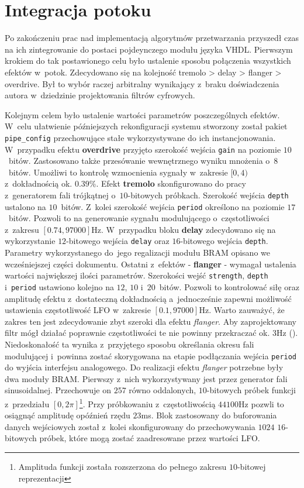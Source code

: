 \section{Integracja potoku}

Po zakończeniu prac nad implementacją algorytmów przetwarzania przyszedł czas na ich zintegrowanie do postaci pojdeynczego modułu języka VHDL. Pierwszym krokiem do tak postawionego celu było ustalenie sposobu połączenia wszystkich efektów w~potok. Zdecydowano się na kolejność tremolo > delay > flanger > overdrive. Był to wybór raczej arbitralny wynikający z~braku doświadczenia autora w~dziedzinie projektowania filtrów cyfrowych. 

Kolejnym celem było ustalenie wartości parametrów poszczególnych efektów. W~celu ułatwienie późniejszych rekonfiguracji systemu stworzony został pakiet \verb|pipe_config| przechowujące stałe wykorzystywane do ich instancjonowania. W~przypadku efektu \textbf{overdrive} przyjęto szerokość wejścia \verb|gain| na poziomie $10$~bitów. Zastosowano także przesówanie wewnętrznego wyniku mnożenia o~$8$~bitów. Umożliwi to kontrolę wzmocnienia sygnały w~zakresie $[0,4)$ z~dokładnością ok. $0.39$\%. Efekt \textbf{tremolo} skonfigurowano do pracy z~generatorem fali trójkątnej o~$10$-bitowych próbkach. Szerokość wejścia \verb|depth| ustalono na $10$~bitów. Z~kolei szerokość wejścia \verb|period| określono na poziomie $17$~bitów. Pozwoli to na generowanie sygnału modulującego o~częstotliwości z~zakresu $[0.74,97000]$Hz. W~przypadku bloku \textbf{delay} zdecydowano się na wykorzystanie $12$-bitowego wejścia \verb|delay| oraz $16$-bitowego wejścia \verb|depth|. Parametry wykorzystanego do~jego regalizacji modułu BRAM opisano we wcześniejszej części dokumentu. Ostatni z~efektów - \textbf{flanger} - wymagał ustalenia wartości największej ilości parametrów. Szerokości wejść \verb|strength|, \verb|depth| i~\verb|period| ustawiono kolejno na $12$, $10$ i~$20$~bitów. Pozwoli to kontrolować siłę oraz amplitudę efektu z~dostateczną dokładnością a~jednocześnie zapewni możliwość ustawienia częstotliwość LFO w~zakresie $[0.1,97000]$Hz. Warto zauważyć, że zakres ten jest zdecydowanie zbyt szeroki dla efektu \textit{flanger}. Aby zaprojektowany filtr mógł działać poprawnie częstotliwości te nie powinny przekraczać ok. $3$Hz (\cite{flanging_analysis}). Niedoskonałość ta wynika z~przyjętego sposobu określania okresu fali modulującej i~powinna zostać skorygowana na etapie podłączania wejścia \verb|period| do wyjścia interfejsu analogowego. Do realizacji efektu \textit{flanger} potrzebne były dwa moduły BRAM. Pierwszy z~nich wykorzystywany jest przez generator fali sinusoidalnej. Przechowuje on $257$ równo oddalonych, $10$-bitowych próbek funkcji z~przedziału $[0,2\pi]$\footnote{Amplituda funkcji została rozszerzona do pełnego zakresu $10$-bitowej reprezentacji}. Przy próbkowaniu z~częstotliwością $44100$Hz pozwli to osiągnąć amplitudę opóźnień rzędu $23$ms. Blok zastosowany do buforowania danych wejściowych został z~kolei skonfigurowany do przechowywania $1024$ $16$-bitowych próbek, które mogą zostać zaadresowane przez wartości LFO.

